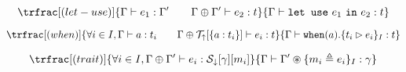 \documentclass{article}[11pt]
\newcommand{\term}[1]{\verb~#1~}
\begin{document}
    \[\trfrac[(let-use)]
    {\Gamma \vdash e_1 : \Gamma' \qquad \Gamma \oplus \Gamma' \vdash e_2 : t}
    {\Gamma \vdash \term{let use} ~ e_1 ~ \term{in} ~ e_2 : t} \]

    \[\trfrac[(when)]
    {\forall i \in I, \Gamma \vdash a : t_i \qquad \Gamma \oplus {\cal T}_\uparrow[\{ a : t_i \}] \vdash e_i : t }
    {\Gamma \vdash \term{when}(a).\{ t_i \rhd e_i \}_I : t} \]

    \[\trfrac[(trait)]
    {\forall i \in I, \Gamma \oplus \Gamma' \vdash e_i : {\cal S}_\downarrow[\gamma][m_i] }
    {\Gamma \vdash \Gamma' \circledast \{ m_i \triangleq e_i \}_I : \gamma } \]
\end{document}
